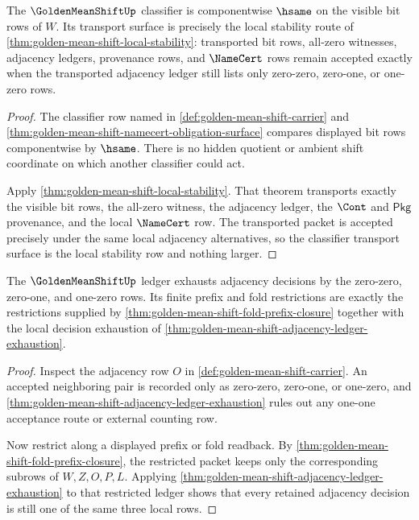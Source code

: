 \begin{theorem}
\label{thm:golden-mean-shift-classifier-row-scope}
The $\GoldenMeanShiftUp$ classifier is componentwise $\hsame$ on the visible bit rows of $W$. Its transport surface is precisely the local stability route of \autoref{thm:golden-mean-shift-local-stability}: transported bit rows, all-zero witnesses, adjacency ledgers, provenance rows, and $\NameCert$ rows remain accepted exactly when the transported adjacency ledger still lists only zero-zero, zero-one, or one-zero rows.
\end{theorem}
\begin{proof}
The classifier row named in \autoref{def:golden-mean-shift-carrier} and \autoref{thm:golden-mean-shift-namecert-obligation-surface} compares displayed bit rows componentwise by $\hsame$. There is no hidden quotient or ambient shift coordinate on which another classifier could act.

Apply \autoref{thm:golden-mean-shift-local-stability}. That theorem transports exactly the visible bit rows, the all-zero witness, the adjacency ledger, the $\Cont$ and $\mathsf{Pkg}$ provenance, and the local $\NameCert$ row. The transported packet is accepted precisely under the same local adjacency alternatives, so the classifier transport surface is the local stability row and nothing larger.
\end{proof}

\begin{theorem}
\label{thm:golden-mean-shift-ledger-row-scope}
The $\GoldenMeanShiftUp$ ledger exhausts adjacency decisions by the zero-zero, zero-one, and one-zero rows. Its finite prefix and fold restrictions are exactly the restrictions supplied by \autoref{thm:golden-mean-shift-fold-prefix-closure} together with the local decision exhaustion of \autoref{thm:golden-mean-shift-adjacency-ledger-exhaustion}.
\end{theorem}
\begin{proof}
Inspect the adjacency row $O$ in \autoref{def:golden-mean-shift-carrier}. An accepted neighboring pair is recorded only as zero-zero, zero-one, or one-zero, and \autoref{thm:golden-mean-shift-adjacency-ledger-exhaustion} rules out any one-one acceptance route or external counting row.

Now restrict along a displayed prefix or fold readback. By \autoref{thm:golden-mean-shift-fold-prefix-closure}, the restricted packet keeps only the corresponding subrows of $W,Z,O,P,L$. Applying \autoref{thm:golden-mean-shift-adjacency-ledger-exhaustion} to that restricted ledger shows that every retained adjacency decision is still one of the same three local rows.
\end{proof}

